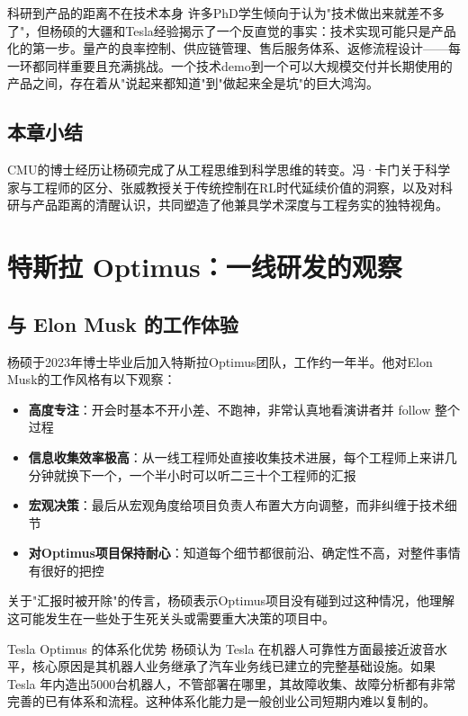 \documentclass[a4paper]{article}
\begin{document}
\begin{warningbox}{科研到产品的距离不在技术本身}
许多PhD学生倾向于认为"技术做出来就差不多了"，但杨硕的大疆和Tesla经验揭示了一个反直觉的事实：技术实现可能只是产品化的第一步。量产的良率控制、供应链管理、售后服务体系、返修流程设计——每一环都同样重要且充满挑战。一个技术demo到一个可以大规模交付并长期使用的产品之间，存在着从"说起来都知道"到"做起来全是坑"的巨大鸿沟。
\end{warningbox}

\subsection{本章小结}

CMU的博士经历让杨硕完成了从工程思维到科学思维的转变。冯·卡门关于科学家与工程师的区分、张威教授关于传统控制在RL时代延续价值的洞察，以及对科研与产品距离的清醒认识，共同塑造了他兼具学术深度与工程务实的独特视角。


\section{特斯拉 Optimus：一线研发的观察}

\subsection{与 Elon Musk 的工作体验}

杨硕于2023年博士毕业后加入特斯拉Optimus团队，工作约一年半。他对Elon Musk的工作风格有以下观察：

\begin{itemize}
    \item \textbf{高度专注}：开会时基本不开小差、不跑神，非常认真地看演讲者并 follow 整个过程
    \item \textbf{信息收集效率极高}：从一线工程师处直接收集技术进展，每个工程师上来讲几分钟就换下一个，一个半小时可以听二三十个工程师的汇报
    \item \textbf{宏观决策}：最后从宏观角度给项目负责人布置大方向调整，而非纠缠于技术细节
    \item \textbf{对Optimus项目保持耐心}：知道每个细节都很前沿、确定性不高，对整件事情有很好的把控
\end{itemize}

关于"汇报时被开除"的传言，杨硕表示Optimus项目没有碰到过这种情况，他理解这可能发生在一些处于生死关头或需要重大决策的项目中。

\begin{knowledgebox}{Tesla Optimus 的体系化优势}
杨硕认为 Tesla 在机器人可靠性方面最接近波音水平，核心原因是其机器人业务继承了汽车业务线已建立的完整基础设施。如果 Tesla 年内造出5000台机器人，不管部署在哪里，其故障收集、故障分析都有非常完善的已有体系和流程。这种体系化能力是一般创业公司短期内难以复制的。
\end{knowledgebox}
\end{document}
